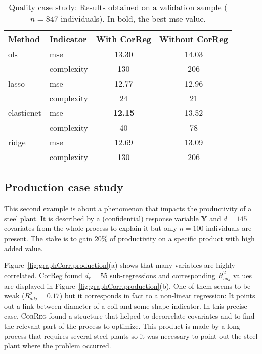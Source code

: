 \documentclass[11pt,a4paper]{article}
\begin{document}
		\begin{table}[h!]
\centering
\begin{tabular}{llcc}
	\hline
	Method& Indicator& With {\sc CorReg} & Without {\sc CorReg} \\ 
	\hline \hline
	{\sc ols} & {\sc mse} & 13.30 & 14.03 \\
		& complexity& 130 & 206 \\
	\hline
	{\sc lasso} & {\sc mse} & 12.77 & 12.96 \\
		& complexity& 24 & 21 \\
	\hline
	elasticnet & {\sc mse} & \textbf{12.15} & 13.52 \\
		& complexity& 40 & 78 \\
	\hline
	ridge & {\sc mse} & 12.69 & 13.09 \\
		& complexity& 130 & 206 \\
	\hline
\end{tabular} 
\caption{Quality case study: Results obtained on a validation sample ($n=847$ individuals). In bold, the best {\sc mse} value.}\label{Res_exfos}
\end{table}




		\subsection{Production case study}
This second example is about a phenomenon that impacts the productivity of a steel plant.
It is described by a (confidential)  response variable $\boldsymbol{Y}$ and $d=145$ covariates from the whole process to explain it but only $n=100$ individuals are present. The stake is to gain $20\%$ of productivity on a specific product with high added value.
		
Figure~\ref{fig:graphCorr.production}(a) shows that many variables are highly correlated. {\sc CorReg} found $d_r=55$ sub-regressions and corresponding $R_{adj}^2$ values are displayed in Figure~\ref{fig:graphCorr.production}(b). One of them seems to be weak ($R_{adj}^2=0.17$) but it corresponds in fact to a non-linear regression: It points out a link between diameter of a coil and some shape indicator. In this precise case, \textsc{CorReg} found a structure that helped to decorrelate covariates and to find the relevant part of the process to optimize. This product is made by a long process that requires several steel plants so it was necessary to point out the steel plant where the problem occurred.	
		
\end{document}
